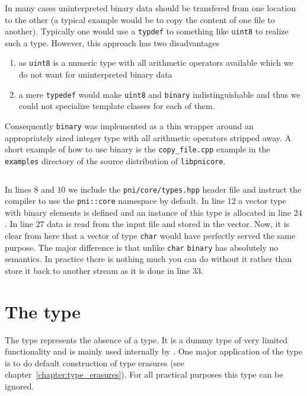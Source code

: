 In many cases uninterpreted binary data should be transfered from one location
to the other (a typical example would be to copy the content of one file to
another).
Typically one would use a {\tt typdef} to something like {\tt uint8} to realize
such a type. However, this approach has two disadvantages
\begin{enumerate}
\item as {\tt uint8} is a numeric type with all arithmetic operators available
which we do not want for uninterpreted binary data 
\item a mere {\tt typedef} would make {\tt uint8} and {\tt binary} 
indistinguishable and thus we could not specialize template classes for each of
them.
\end{enumerate}
Consequently {\tt binary} was implemented as a thin wrapper around an
appropriately sized integer type with all arithmetic operators stripped away.
A short example of how to use binary is the {\tt copy\_file.cpp} example in the
{\tt examples} directory of the source distribution of {\tt libpnicore}. 

\inputminted[linenos,
             firstline=24,
             frame=lines,
             label=examples/copy\_file.cpp]
{cpp}{../examples/copy_file.cpp}

In lines $8$ and $10$ we include the {\tt pni/core/types.hpp} header file and
instruct the compiler to use the {\tt pni::core} namespace by default. In line
$12$ a vector type with binary elements is defined and an instance of this type
is allocated in line $24$. 
In line $27$ data is read from the input file and stored in the vector. Now, it
is clear from here that a vector of type  {\tt char} would have perfectly served
the same purpose. The major difference is that unlike {\tt char} {\tt binary}
has absolutely no semantics. In practice there is nothing much you can do
without it rather than store it back to another stream as it is done in 
line $33$.

\section{The  type}\label{section:using_none}

The  type represents the absence of a type. It is a dummy type 
of very limited functionality and is mainly used internally by 
\libpnicore. One major application of the  type is to do default
construction of type erasures (see chapter~\ref{chapter:type_erasures}). 
For all practical purposes this type can be ignored.

